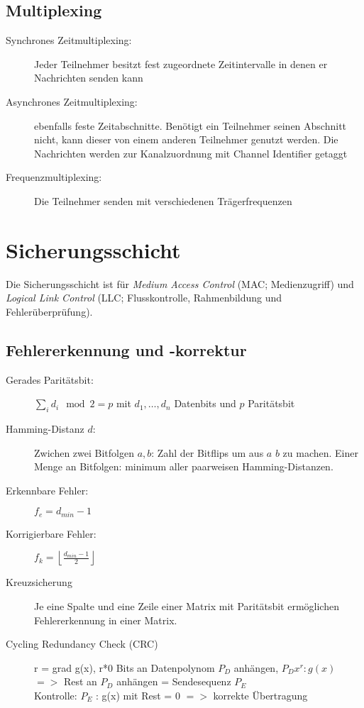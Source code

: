 \documentclass[a4paper]{article}
\begin{document}
\subsection{Multiplexing}
\begin{description}
    \item[Synchrones Zeitmultiplexing:] Jeder Teilnehmer besitzt fest zugeordnete Zeitintervalle in denen er Nachrichten senden kann
    \item[Asynchrones Zeitmultiplexing:] ebenfalls feste Zeitabschnitte. Benötigt ein Teilnehmer seinen Abschnitt nicht, kann dieser von einem anderen Teilnehmer genutzt werden. Die Nachrichten werden zur Kanalzuordnung mit Channel Identifier getaggt
    \item[Frequenzmultiplexing:] Die Teilnehmer senden mit verschiedenen Trägerfrequenzen
\end{description}

\section{Sicherungsschicht}
Die Sicherungsschicht ist für \textit{Medium Access Control} (MAC; Medienzugriff) und \textit{Logical Link Control} (LLC; Flusskontrolle, Rahmenbildung und Fehlerüberprüfung).

\subsection{Fehlererkennung und -korrektur}
\begin{description}
    \item[Gerades Paritätsbit:] $\sum_i d_i \mod 2 = p$ mit $d_1, \dots, d_n$ Datenbits und $p$ Paritätsbit
    \item[Hamming-Distanz $d$:] Zwichen zwei Bitfolgen $a, b$: Zahl der Bitflips um aus $a$ $b$ zu machen. Einer Menge an Bitfolgen: minimum aller paarweisen Hamming-Distanzen.
    \item[Erkennbare Fehler:] $f_e = d_{min}-1$
    \item[Korrigierbare Fehler:] $f_k = \left\lfloor \frac{d_{min}-1}{2} \right\rfloor$
    \item[Kreuzsicherung] Je eine Spalte und eine Zeile einer Matrix mit Paritätsbit ermöglichen Fehlererkennung in einer Matrix.
    \item[Cycling Redundancy Check (CRC)] r = grad g(x), r*0 Bits an Datenpolynom $P_D$ anhängen, $P_D x^r : g(x)$ $=>$ Rest an $P_D$ anhängen = Sendesequenz $P_E$ \\Kontrolle: $P_E$ : g(x) mit Rest = 0 $=>$ korrekte Übertragung
\end{description}
\end{document}
